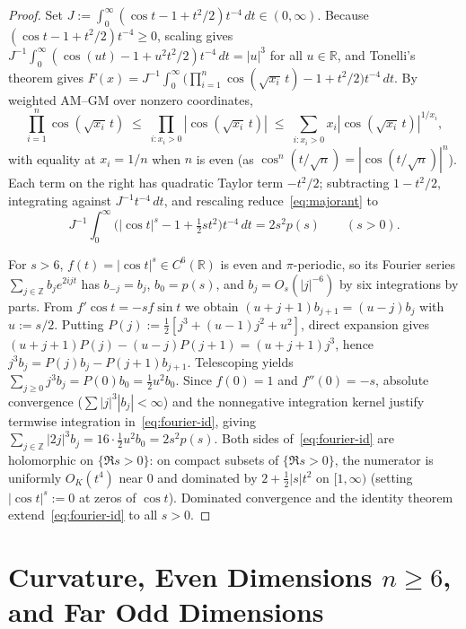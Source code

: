 \documentclass[11pt]{article}
\theoremstyle{plain}
\theoremstyle{definition}
\theoremstyle{remark}
\begin{document}
\begin{proof}
Set $J := \int_0^\infty (\cos t - 1 + t^2/2)t^{-4}\,dt \in (0, \infty)$.
Because $(\cos t - 1 + t^2/2)t^{-4} \ge 0$, scaling gives $J^{-1}\int_0^\infty (\cos(ut) - 1 + u^2 t^2/2)t^{-4}\,dt = |u|^3$ for all $u \in \mathbb{R}$, and Tonelli's theorem gives $F(x) = J^{-1}\int_0^\infty \bigl(\prod_{i=1}^n \cos(\sqrt{x_i}\,t) - 1 + t^2/2\bigr)t^{-4}\,dt$.
By weighted AM--GM over nonzero coordinates,
\[
\prod_{i=1}^n \cos(\sqrt{x_i}\,t) \;\le\; \prod_{i: x_i > 0} |\cos(\sqrt{x_i}\,t)| \;\le\; \sum_{i: x_i > 0} x_i |\cos(\sqrt{x_i}\,t)|^{1/x_i},
\]
with equality at $x_i = 1/n$ when $n$ is even (as $\cos^n(t/\sqrt{n}) = |\cos(t/\sqrt{n})|^n$).
Each term on the right has quadratic Taylor term $-t^2/2$; subtracting $1 - t^2/2$, integrating against $J^{-1}t^{-4}\,dt$, and rescaling reduce~\eqref{eq:majorant} to
\begin{equation}\label{eq:fourier-id}
J^{-1}\int_0^\infty \bigl(|\cos t|^s - 1 + \tfrac{1}{2}st^2\bigr)t^{-4}\,dt = 2s^2 p(s) \qquad (s > 0).
\end{equation}

For $s > 6$, $f(t) = |\cos t|^s \in C^6(\mathbb{R})$ is even and $\pi$-periodic, so its Fourier series $\sum_{j \in \mathbb{Z}} b_j e^{2ijt}$ has $b_{-j} = b_j$, $b_0 = p(s)$, and $b_j = O_s(|j|^{-6})$ by six integrations by parts.
From $f'\cos t = -s f\sin t$ we obtain $(u + j + 1)b_{j+1} = (u - j)b_j$ with $u := s/2$.
Putting $P(j) := \frac{1}{2}[j^3 + (u - 1)j^2 + u^2]$, direct expansion gives $(u + j + 1)P(j) - (u - j)P(j + 1) = (u + j + 1)j^3$, hence $j^3 b_j = P(j)b_j - P(j + 1)b_{j+1}$.
Telescoping yields $\sum_{j \ge 0} j^3 b_j = P(0)b_0 = \frac{1}{2}u^2 b_0$.
Since $f(0) = 1$ and $f''(0) = -s$, absolute convergence ($\sum |j|^3|b_j| < \infty$) and the nonnegative integration kernel justify termwise integration in~\eqref{eq:fourier-id}, giving $\sum_{j \in \mathbb{Z}} |2j|^3 b_j = 16 \cdot \frac{1}{2}u^2 b_0 = 2s^2 p(s)$.
Both sides of~\eqref{eq:fourier-id} are holomorphic on $\{\Re s > 0\}$: on compact subsets of $\{\Re s > 0\}$, the numerator is uniformly $O_K(t^4)$ near $0$ and dominated by $2 + \frac{1}{2}|s|t^2$ on $[1, \infty)$ (setting $|\cos t|^s := 0$ at zeros of $\cos t$).
Dominated convergence and the identity theorem extend~\eqref{eq:fourier-id} to all $s > 0$.
\end{proof}

\section{Curvature, Even Dimensions \texorpdfstring{$n \ge 6$}{n >= 6}, and Far Odd Dimensions}
\end{document}
